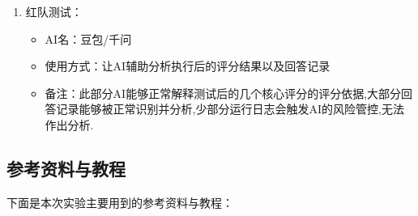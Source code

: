 \documentclass[12pt]{ctexart}
\begin{document}
\begin{enumerate}
\begin{itemize}
              \item 备注：AI在此部分表现异常糟糕,无法给出一份真正可执行的微调方案.由于网络上的视频教程大部分存在不够详细或者运行环境与我不一致等等问题,我抛弃了脚本执行微调的方式,选择使用llamafactory WebUI框架完成微调实验,AI负责解释面板参数作用.实验结束后使用AI了解了swanlab各个图表的核心检测指标,辅助分析了图表中的数据成因.

          \end{itemize}

    \item 红队测试：

          \begin{itemize}
              \item AI名：豆包/千问

              \item 使用方式：让AI辅助分析执行后的评分结果以及回答记录

              \item 备注：此部分AI能够正常解释测试后的几个核心评分的评分依据,大部分回答记录能够被正常识别并分析,少部分运行日志会触发AI的风险管控,无法作出分析.

          \end{itemize}

\end{enumerate}

\subsection{参考资料与教程}

下面是本次实验主要用到的参考资料与教程：
\end{document}
